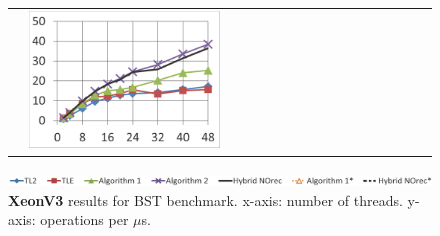 \begin{figure}
\begin{minipage}{1\linewidth}
\begin{tabular}{m{0.03\linewidth}m{0.485\linewidth}m{0.485\linewidth}}
        \vspace{-8mm}\includegraphics[width=\linewidth]{figures/graphs/20i20d100000k-nrq0.png} &
        \vspace{-8mm}\includegraphics[width=\linewidth]{figures/graphs/20i20d100000k-nrq1.png}
        \\
    \end{tabular}
\end{minipage}
    \vspace{-2mm}
	\includegraphics[width=\linewidth]{figures/graphs/power8/dsbench3_legend_power.png}
    \vspace{-2mm}
\caption{\textbf{XeonV3} results for BST benchmark. x-axis: number of threads. y-axis: operations per $\mu$s.}
\label{fig-exp-xeonv3}
\end{figure}

